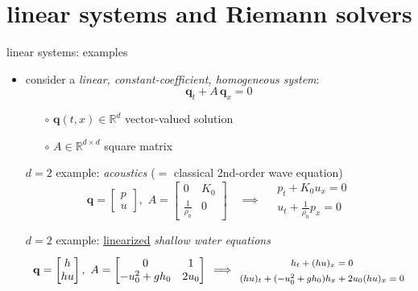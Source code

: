 \documentclass[10pt,dvipsnames,usepdftitle=false,
hyperref={pdftitle = {Finite volume methods},
    pdfauthor = {Ed Bueler}}]{beamer}
\newcommand{\bq}{\mathbf{q}}
\newcommand{\RR}{\mathbb{R}}
\begin{document}
\section{linear systems and Riemann solvers}

\begin{frame}{linear systems: examples}

\begin{itemize}
\item consider a \emph{linear, constant-coefficient, homogeneous system}:
  $$\bq_t + A\, \bq_x=0$$

    \begin{itemize}
    \item[$\circ$] $\bq(t,x) \in \RR^d$ vector-valued solution
    \item[$\circ$] $A\in\RR^{d\times d}$ square matrix
    \end{itemize}
 
\bigskip
\setlength{\itemindent}{21mm}
\item[$d=2$ example:] \emph{acoustics} ($=$ classical 2nd-order wave equation)
        $$\bq = \begin{bmatrix} p \\ u \end{bmatrix}, \,\, A = \begin{bmatrix} 0 & K_0 \\ \frac{1}{\rho_0} & 0 \end{bmatrix} \quad \implies \quad \begin{matrix} p_t + K_0 u_x = 0 \\ u_t + \frac{1}{\rho_0} p_x = 0 \end{matrix}$$
\item[$d=2$ example:] \underline{linearized} \emph{shallow water equations}
        $$\bq = \begin{bmatrix} h \\ h u \end{bmatrix}, \,\, A = \begin{bmatrix} 0 & 1 \\ -u_0^2+gh_0 & 2 u_0 \end{bmatrix} \, \implies \, {\footnotesize \begin{matrix} {\large \strut} h_t + (hu)_x = 0 \\ {\large \strut} (h u)_t + (-u_0^2+gh_0) h_x + 2u_0 (h u)_x = 0 \end{matrix} }$$
\end{itemize}
\end{frame}
\end{document}
